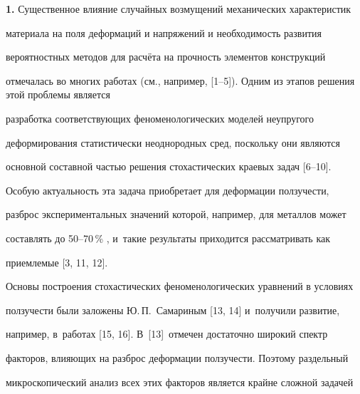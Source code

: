 \date{13.12.2007} 



\address{\samgtu}







\maketitle









\textbf{1.} Существенное влияние случайных возмущений механических характеристик 

материала на поля деформаций и напряжений и необходимость развития 

вероятностных методов для расчёта на прочность элементов конструкций 

отмечалась во многих работах (см., например, [1--5]). Одним из этапов решения этой проблемы является 

разработка соответствующих феноменологических моделей неупругого 

деформирования статистически неоднородных сред, поскольку они являются 

основной составной частью решения стохастических краевых задач [6--10]. 

Особую актуальность эта задача приобретает для деформации ползучести, 

разброс экспериментальных значений которой, например, для металлов может 

составлять до 50--70\,\% , и~такие результаты приходится рассматривать как 

приемлемые [3, 11, 12].



Основы построения стохастических феноменологических уравнений в условиях 

ползучести были заложены Ю.\,П.~Самариным [13, 14] и~получили развитие, 

например, в~работах [15, 16]. В~[13]~отмечен достаточно широкий спектр 

факторов, влияющих на разброс деформации ползучести. Поэтому раздельный 

микроскопический анализ всех этих факторов является крайне сложной задачей 

